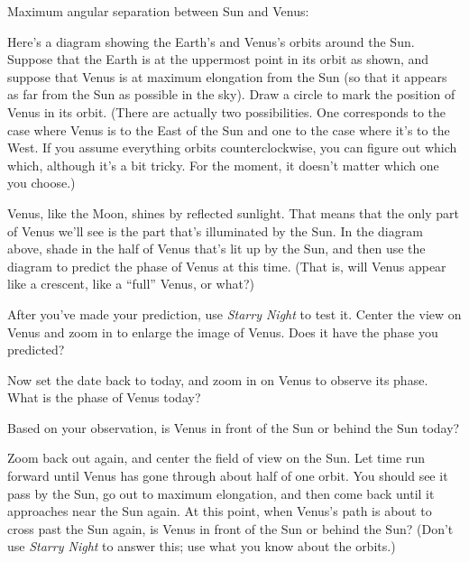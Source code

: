 \documentclass[twoside]{report}
\begin{document}
Maximum angular separation between Sun and Venus:

\vskip 0.7in

Here's a diagram showing the Earth's and Venus's orbits around the
Sun.  Suppose that the Earth is at the uppermost point in its orbit as
shown, and suppose that Venus is at maximum elongation from the Sun
(so that it appears as far from the Sun as possible in the sky).  Draw
a circle to mark the position of Venus in its orbit.  (There are
actually two possibilities.  One corresponds to the case where Venus
is to the East of the Sun and one to the case where it's to the West.
If you assume everything orbits
counterclockwise, you can figure out which which, although
it's a bit tricky.  For the moment, it doesn't matter which one you choose.)

\begin{figure}[h]
\centerline{\epsfxsize 3in}
\end{figure}


Venus, like the Moon, shines by reflected sunlight.  That means that
the only part of Venus we'll see is the part that's illuminated by the 
Sun.  In the diagram above, shade in the half of Venus that's lit up by
the Sun, and then use the diagram to predict the phase of Venus
at this time.  (That is, will Venus appear like a crescent, like
a ``full'' Venus, or what?)

\vskip 0.7in

After you've made your prediction, use {\it Starry Night} to test it.
Center the view on Venus and zoom in to enlarge the image of Venus.
Does it have the phase you predicted?

\vskip 0.7in

Now set the date back to today, and 
zoom in on Venus to observe its phase.  What is the phase of Venus today?

\vskip 0.7in

Based on your observation, is Venus in front of the Sun or behind the Sun
today?

\vskip 0.7in

Zoom back out again, and center the field of view on the Sun.  Let time
run forward until Venus has gone through about half of one orbit.  You
should see it pass by the Sun, go out to maximum elongation, and then come
back until it approaches near the Sun again.  At this point, when
Venus's path is about to cross past the Sun again, is Venus in front
of the Sun or behind the Sun?  (Don't use {\it Starry Night} to answer this; 
use what you know about the orbits.)
\end{document}
